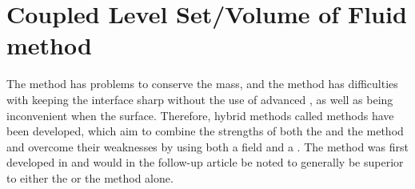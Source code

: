 



\section{Coupled Level Set/Volume of Fluid method}

The \LS method has problems to conserve the mass, and the \VOF method has difficulties with keeping the interface sharp without the use of advanced , as well as being inconvenient when \visualizing the surface. Therefore, hybrid methods called \CLSVOF methods have been developed, which aim to combine the strengths of both the \LS and the \VOF method and overcome their weaknesses by using both a  field and a . The \CLSVOF method was first developed in \citep{Puckett1998} and would in the follow-up article \citep{Sussman2000} be noted to generally be superior to either the \LS or the \VOF method alone.